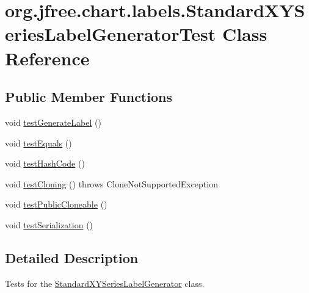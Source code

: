 \hypertarget{classorg_1_1jfree_1_1chart_1_1labels_1_1_standard_x_y_series_label_generator_test}{}\section{org.\+jfree.\+chart.\+labels.\+Standard\+X\+Y\+Series\+Label\+Generator\+Test Class Reference}
\label{classorg_1_1jfree_1_1chart_1_1labels_1_1_standard_x_y_series_label_generator_test}
\subsection*{Public Member Functions}
\begin{DoxyCompactItemize}
\item 
void \mbox{\hyperlink{classorg_1_1jfree_1_1chart_1_1labels_1_1_standard_x_y_series_label_generator_test_a921dc335f66b6092e3a41126c6f5898a}{test\+Generate\+Label}} ()
\item 
void \mbox{\hyperlink{classorg_1_1jfree_1_1chart_1_1labels_1_1_standard_x_y_series_label_generator_test_a58af0d3b8d5997eb94e6aa7df6890c37}{test\+Equals}} ()
\item 
void \mbox{\hyperlink{classorg_1_1jfree_1_1chart_1_1labels_1_1_standard_x_y_series_label_generator_test_abc130d26f1867758eb982013870f9b2a}{test\+Hash\+Code}} ()
\item 
void \mbox{\hyperlink{classorg_1_1jfree_1_1chart_1_1labels_1_1_standard_x_y_series_label_generator_test_a9ca23ff9ec64e4ac43345cf784465056}{test\+Cloning}} ()  throws Clone\+Not\+Supported\+Exception 
\item 
void \mbox{\hyperlink{classorg_1_1jfree_1_1chart_1_1labels_1_1_standard_x_y_series_label_generator_test_a85635195f0f4e1559ee066dbb5859df0}{test\+Public\+Cloneable}} ()
\item 
void \mbox{\hyperlink{classorg_1_1jfree_1_1chart_1_1labels_1_1_standard_x_y_series_label_generator_test_a553f1f393617d0faa05f623b59a55715}{test\+Serialization}} ()
\end{DoxyCompactItemize}


\subsection{Detailed Description}
Tests for the \mbox{\hyperlink{classorg_1_1jfree_1_1chart_1_1labels_1_1_standard_x_y_series_label_generator}{Standard\+X\+Y\+Series\+Label\+Generator}} class. 

